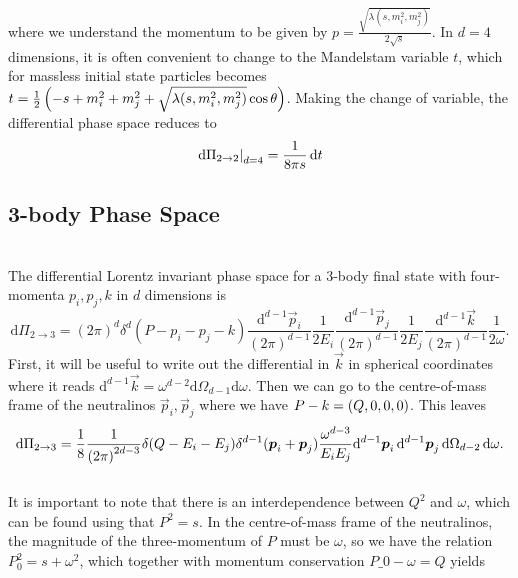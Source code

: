         where we understand the momentum to be given by \(p = \frac{\sqrt{\lambda(s, m_i^2, m_j^2)}}{2\sqrt{s}}\).
        In \(d=4\) dimensions, it is often convenient to change to the Mandelstam variable \(t\), which for massless initial state particles becomes \(t=\frac{1}{2} \left(-s+m_i^2+m_j^2+\sqrt{\lambda(s,m_i^2,m_j^2)}\cos\theta\right)\).
        Making the change of variable, the differential phase space reduces to
        \begin{equation}
            \left.\mathrm{d}\Pi_{2\to 2}\right|_{d=4} = \frac{1}{8\pi s} \,\mathrm{d}t
        \end{equation}

    \subsection{3-body Phase Space}
        \\
        The differential Lorentz invariant phase space for a 3-body final state with four-momenta \(p_i, p_j, k\) in \(d\) dimensions is
        \begin{equation}
            \mathrm{d}\Pi_{2\to 3} = (2\pi)^d \delta^d(P - p_i - p_j - k) \frac{\mathrm{d}^{d-1} \vec{p}_i}{(2\pi)^{d-1}} \frac{1}{2E_i} \frac{\mathrm{d}^{d-1} \vec{p}_j}{(2\pi)^{d-1}} \frac{1}{2E_j} \frac{\mathrm{d}^{d-1} \vec{k}}{(2\pi)^{d-1}} \frac{1}{2\omega}.
        \end{equation}
        First, it will be useful to write out the differential in \(\vec{k}\) in spherical coordinates where it reads \(\mathrm{d}^{d-1}\vec{k} = \omega^{d-2} \mathrm{d}\Omega_{d-1} \mathrm{d}\omega\).
        Then we can go to the centre-of-mass frame of the neutralinos \(\vec{p}_i, \vec{p}_j\) where we have \(P - k = \left(Q, 0, 0, 0\right)\).
        This leaves
        \begin{equation}
            \mathrm{d}\Pi_{2\to 3} = \frac{1}{8} \frac{1}{\left(2\pi\right)^{2d-3}} \delta(Q - E_i - E_j) \delta^{d-1}(\boldsymbol{p}_i + \boldsymbol{p}_j) \frac{\omega^{d-3}}{E_i E_j} \mathrm{d}^{d-1}\boldsymbol{p}_i\, \mathrm{d}^{d-1}\boldsymbol{p}_j\, \mathrm{d}\Omega_{d-2}\, \mathrm{d}\omega.
        \end{equation}
        \\
        It is important to note that there is an interdependence between \(Q^2\) and \(\omega\), which can be found using that \(P^2 = s\).
        In the centre-of-mass frame of the neutralinos, the magnitude of the three-momentum of \(P\) must be \(\omega\), so we have the relation \(P_0^2 = s + \omega^2\), which together with momentum conservation \(P\_0 - \omega = Q\) yields
